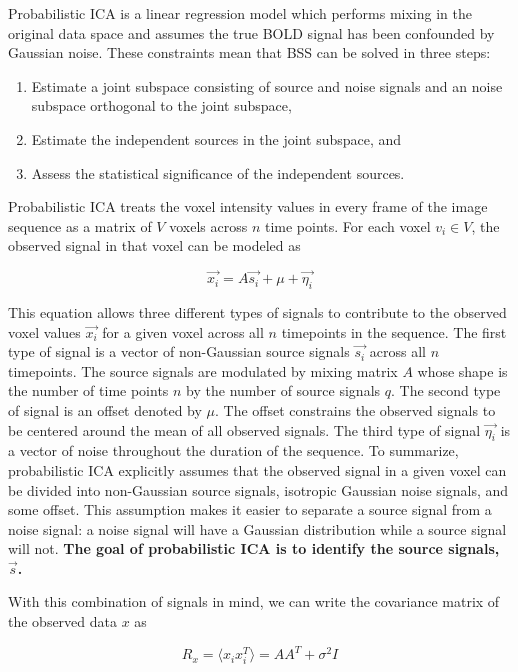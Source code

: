 Probabilistic ICA is a linear regression model which performs mixing in the original data space and assumes the true BOLD signal has been confounded by Gaussian noise. These constraints mean that BSS can be solved in three steps:

\begin{enumerate}
\item Estimate a joint subspace consisting of source and noise signals and an noise subspace orthogonal to the joint subspace,
\item Estimate the independent sources in the joint subspace, and 
\item Assess the statistical significance of the independent sources.
\end{enumerate} 

Probabilistic ICA treats the voxel intensity values in every frame of the image sequence as a matrix of $V$ voxels across $n$ time points. For each voxel $v_i \in V$, the observed signal in that voxel can be modeled as

\begin{equation}
\label{ch3:eq:ica01}
\vec{x_i} = A \vec{s_i} + \mu + \vec{\eta_i}
\end{equation}

\noindent This equation allows three different types of signals to contribute to the observed voxel values $\vec{x_i}$ for a given voxel across all $n$ timepoints in the sequence. The first type of signal is a vector of non-Gaussian source signals $\vec{s_i}$ across all $n$ timepoints. The source signals are modulated by mixing matrix $A$ whose shape is the number of time points $n$ by the number of source signals $q$. The second type of signal is an offset denoted by $\mu$. The offset constrains the observed signals to be centered around the mean of all observed signals. The third type of signal $\vec{\eta_i}$ is a vector of noise throughout the duration of the sequence. To summarize, probabilistic ICA explicitly assumes that the observed signal in a given voxel can be divided into non-Gaussian source signals, isotropic Gaussian noise signals, and some offset. This assumption makes it easier to separate a source signal from a noise signal: a noise signal will have a Gaussian distribution while a source signal will not. \textbf{The goal of probabilistic ICA is to identify the source signals, $\vec{s}$.}

With this combination of signals in mind, we can write the covariance matrix of the observed data $x$ as

\begin{equation}
\label{ch3:eq:cov-01}
R_x = \langle x_i x_i^T \rangle = AA^T + \sigma ^2 I
\end{equation}

